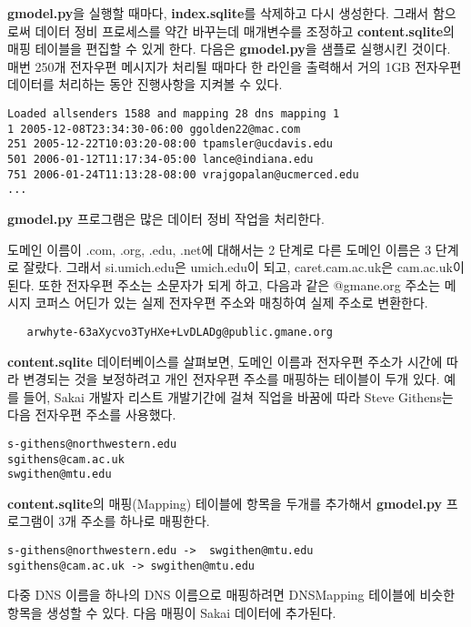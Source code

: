 {\bf gmodel.py}을 실행할 때마다, {\bf index.sqlite}를 삭제하고 다시 생성한다.
그래서 함으로써 데이터 정비 프로세스를 약간 바꾸는데 매개변수를 조정하고 {\bf content.sqlite}의 매핑 테이블을 편집할 수 있게 한다.
다음은 {\bf gmodel.py}을 샘플로 실행시킨 것이다. 
매번 250개 전자우편 메시지가 처리될 때마다 한 라인을 출력해서 거의 1GB 전자우편 데이터를 처리하는 동안 진행사항을 지켜볼 수 있다.

\beforeverb
\begin{verbatim}
Loaded allsenders 1588 and mapping 28 dns mapping 1
1 2005-12-08T23:34:30-06:00 ggolden22@mac.com
251 2005-12-22T10:03:20-08:00 tpamsler@ucdavis.edu
501 2006-01-12T11:17:34-05:00 lance@indiana.edu
751 2006-01-24T11:13:28-08:00 vrajgopalan@ucmerced.edu
...
\end{verbatim}
\afterverb
%

{\bf gmodel.py} 프로그램은 많은 데이터 정비 작업을 처리한다.

도메인 이름이  .com, .org, .edu, .net에 대해서는 2 단계로 다른 도메인 이름은 3 단계로 잘랐다.
그래서 si.umich.edu은 umich.edu이 되고, caret.cam.ac.uk은 cam.ac.uk이 된다.
또한 전자우편 주소는 소문자가 되게 하고, 다음과 같은  @gmane.org 주소는 
메시지 코퍼스 어딘가 있는 실제 전자우편 주소와 매칭하여 실제 주소로 변환한다.

\beforeverb
\begin{verbatim}
   arwhyte-63aXycvo3TyHXe+LvDLADg@public.gmane.org
\end{verbatim}
\afterverb
%

{\bf content.sqlite} 데이터베이스를 살펴보면, 도메인 이름과 전자우편 주소가 시간에 따라 변경되는 것을 보정하려고 개인 전자우편 주소를 매핑하는 테이블이 두개 있다.
예를 들어, Sakai 개발자 리스트 개발기간에 걸쳐 직업을 바꿈에 따라 Steve Githens는 다음 전자우편 주소를 사용했다.

\beforeverb
\begin{verbatim}
s-githens@northwestern.edu
sgithens@cam.ac.uk
swgithen@mtu.edu
\end{verbatim}
\afterverb
%

{\bf content.sqlite}의 매핑(Mapping) 테이블에 항목을 두개를 추가해서 {\bf gmodel.py} 프로그램이 3개 주소를 하나로 매핑한다.

\beforeverb
\begin{verbatim}
s-githens@northwestern.edu ->  swgithen@mtu.edu
sgithens@cam.ac.uk -> swgithen@mtu.edu
\end{verbatim}
\afterverb
%

다중 DNS 이름을 하나의 DNS 이름으로 매핑하려면 DNSMapping 테이블에 비슷한 항목을 생성할 수 있다.
다음 매핑이 Sakai 데이터에 추가된다.

